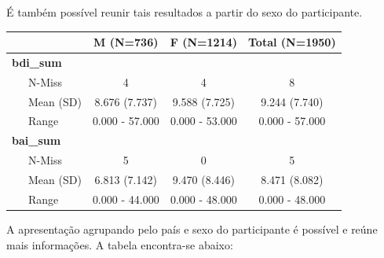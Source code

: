 \documentclass[
]{book}
\newenvironment{Shaded}{\begin{snugshade}}{\end{snugshade}}
\newcommand{\DataTypeTok}[1]{\textcolor[rgb]{0.13,0.29,0.53}{#1}}
\newcommand{\KeywordTok}[1]{\textcolor[rgb]{0.13,0.29,0.53}{\textbf{#1}}}
\newcommand{\NormalTok}[1]{#1}
\newcommand{\OperatorTok}[1]{\textcolor[rgb]{0.81,0.36,0.00}{\textbf{#1}}}
\newcommand{\OtherTok}[1]{\textcolor[rgb]{0.56,0.35,0.01}{#1}}
\newcommand{\StringTok}[1]{\textcolor[rgb]{0.31,0.60,0.02}{#1}}
\begin{document}
É também possível reunir tais resultados a partir do sexo do
participante.

\begin{Shaded}
\end{Shaded}

\begin{longtable}[]{@{}lccc@{}}
\toprule
& M (N=736) & F (N=1214) & Total (N=1950)\tabularnewline
\midrule
\endhead
\textbf{bdi\_sum} & & &\tabularnewline
~~~N-Miss & 4 & 4 & 8\tabularnewline
~~~Mean (SD) & 8.676 (7.737) & 9.588 (7.725) & 9.244
(7.740)\tabularnewline
~~~Range & 0.000 - 57.000 & 0.000 - 53.000 & 0.000 -
57.000\tabularnewline
\textbf{bai\_sum} & & &\tabularnewline
~~~N-Miss & 5 & 0 & 5\tabularnewline
~~~Mean (SD) & 6.813 (7.142) & 9.470 (8.446) & 8.471
(8.082)\tabularnewline
~~~Range & 0.000 - 44.000 & 0.000 - 48.000 & 0.000 -
48.000\tabularnewline
\bottomrule
\end{longtable}

A apresentação agrupando pelo país e sexo do participante é possível e
reúne mais informações. A tabela encontra-se abaixo:

\begin{Shaded}
\end{Shaded}
\end{document}
